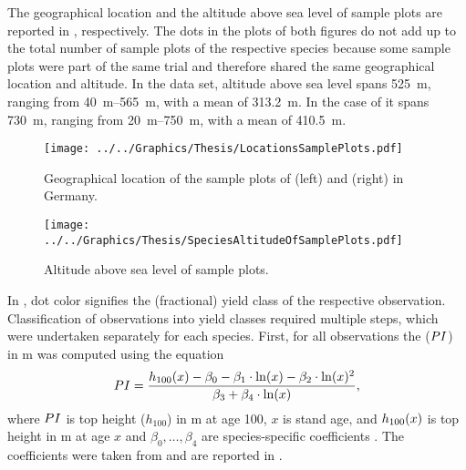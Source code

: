 The geographical location and the altitude above sea level of sample plots are reported in , respectively.  The dots in the plots of both figures do not add up to the total number of sample plots of the respective species because some sample plots were part of the same trial and therefore shared the same geographical location and altitude.  In the \Beech{} data set, altitude above sea level spans \SI{525}{\meter}, ranging from \SIrange{40}{565}{\meter}, with a mean of \SI{313.2}{\meter}.  In the case of \Spruce{} it spans \SI{730}{\meter}, ranging from \SIrange{20}{750}{\meter}, with a mean of \SI{410.5}{\meter}.

\begin{figure}[h]
  \centering
  \texttt{[image: ../../Graphics/Thesis/LocationsSamplePlots.pdf]}
  \caption{Geographical location of the sample plots of \Beech{} (left) and \Spruce{} (right) in Germany.}
  \label{fig:LocationsSamplePlots}
\end{figure}

\begin{figure}[h]
  \centering
  \texttt{[image: ../../Graphics/Thesis/SpeciesAltitudeOfSamplePlots.pdf]}
  \caption{Altitude above sea level of sample plots.}
  \label{fig:SpeciesAltitudeOfSamplePlots}
\end{figure}

In , dot color signifies the (fractional) yield class of the respective observation.  Classification of observations into yield classes required multiple steps, which were undertaken separately for each species.  First, for all observations the \ProductivityIndexText{} (\(PI{}\)) in \si{\meter} was computed using the equation
\begin{equation}
  \label{eq:NagelFunctionSolvedForProductivityIndex}
  PI{} = \frac{h_{100}(x) - \beta_0 - \beta_1 \cdot \ln(x) - \beta_2 \cdot \ln(x)^2 }{\beta_3 + \beta_4 \cdot \ln(x)},
\end{equation}
where \(PI{}\) is top height (\(h_{100}\)) in \si{\meter} at age \SI{100}{\year}, \(x\) is stand age, and \(h_{100}(x)\) is top height in \si{\meter} at age \(x\) and \(\beta_0, \ldots, \beta_4\) are species-specific coefficients \parencite{Nagel1999}.  The coefficients were taken from \textcite{Nagel1999} and are reported in .

